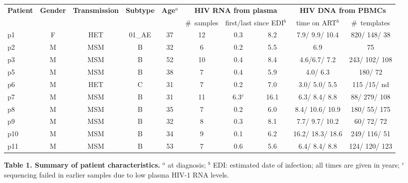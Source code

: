 \documentclass[aps,rmp,onecolumn,linenumbers]{revtex4-1}
\begin{document}
\clearpage
\begin{table}[tb]
\begin{tabular}{|lcccc||c|cc||c|c|}
\hline
{\bf Patient} & {\bf Gender} &{\bf Transmission} & {\bf Subtype} & {\bf Age$^{a}$} & 
\multicolumn{3}{c||}{\bf HIV RNA from plasma}&
\multicolumn{2}{c|}{\bf HIV DNA from PBMCs}\\
&&&&& \#~samples& 
\multicolumn{2}{|c||}{first/last since EDI$^{b}$} & time on ART$^{b}$ & \#~templates \\
\hline
p1 & F & HET & 01\_AE &37& 12 & 0.3 & 8.2&7.9/ 9.9/ 10.4&820/ 148/ 38 \\
p2 & M & MSM &B &32& 6 & 0.2 & 5.5&6.9&75\\ 
p3 & M & MSM &B &52& 10 & 0.4 & 8.4&4.6/6.7/ 7.2&243/ 102/ 108 \\ 
p5 & M & MSM &B &38& 7 & 0.4 & 5.9&4.0/ 6.3&180/ 72 \\
p6 & M & HET &C &31& 7 & 0.2 & 7.0&3.0/ 5.0/ 5.5&115 /15/ nd \\ 
p7 & M & MSM &B &31& 11 & 6.3$^{c}$& 16.1&6.3/ 8.4/ 8.8&88/ 279/ 108 \\ 
p8 & M & MSM &B &35& 7 & 0.2 & 6.0&8.4/ 10.6/ 10.9&180/ 55/ 175 \\ 
p9 & M & MSM &B &32& 8 & 0.3 & 8.1&7.7/ 9.7/ 10.2&60/ 72/ 72 \\ 
p10 & M & MSM &B &34& 9 & 0.1 & 6.2&16.2/ 18.3/ 18.6&249/ 116/ 51 \\ 
p11 & M & MSM &B &53& 7 & 0.6 & 5.6&6.4/ 8.4/ 8.8&124/ 120/ 123 \\\hline 
\end{tabular}
\begin{flushleft}
{{\bf Table 1. Summary of patient characteristics.} $^{a}$ at diagnosis; $^{b}$ EDI: estimated date of infection; all times are given in years; $^{c}$ sequencing failed in earlier samples due to low plasma HIV-1 RNA levels.}
\end{flushleft}
\label{tab:patients}
\end{table}
\end{document}
